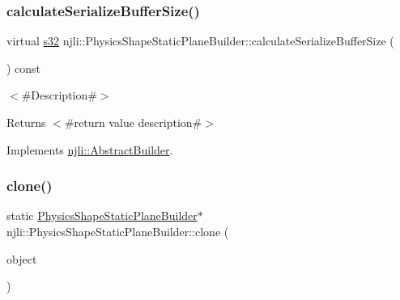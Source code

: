 \mbox{\label{classnjli_1_1_physics_shape_static_plane_builder_ad831802d7b9ca50edd59ab68ed5d2437}} 
\subsubsection{\texorpdfstring{calculate\+Serialize\+Buffer\+Size()}{calculateSerializeBufferSize()}}
{\footnotesize\ttfamily virtual \mbox{\hyperlink{_util_8h_aa62c75d314a0d1f37f79c4b73b2292e2}{s32}} njli\+::\+Physics\+Shape\+Static\+Plane\+Builder\+::calculate\+Serialize\+Buffer\+Size (\begin{DoxyParamCaption}{ }\end{DoxyParamCaption}) const\hspace{0.3cm}{\ttfamily [virtual]}}

$<$\#\+Description\#$>$

\begin{DoxyReturn}{Returns}
$<$\#return value description\#$>$ 
\end{DoxyReturn}


Implements \mbox{\hyperlink{classnjli_1_1_abstract_builder_aa1d220053e182c37b31b427499c6eacf}{njli\+::\+Abstract\+Builder}}.

\mbox{\label{classnjli_1_1_physics_shape_static_plane_builder_a5403d83289199a59928581d08195f4f0}} 
\subsubsection{\texorpdfstring{clone()}{clone()}}
{\footnotesize\ttfamily static \mbox{\hyperlink{classnjli_1_1_physics_shape_static_plane_builder}{Physics\+Shape\+Static\+Plane\+Builder}}$\ast$ njli\+::\+Physics\+Shape\+Static\+Plane\+Builder\+::clone (\begin{DoxyParamCaption}\item[{const \mbox{\hyperlink{classnjli_1_1_physics_shape_static_plane_builder}{Physics\+Shape\+Static\+Plane\+Builder}} \&}]{object }\end{DoxyParamCaption})\hspace{0.3cm}{\ttfamily [static]}}

